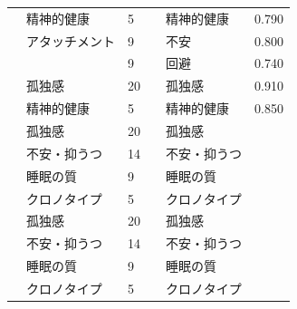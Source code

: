 \begin{landscape}
\begin{longtable}{p{2cm}p{2cm}p{2cm}p{6cm}p{2cm}p{2cm}}
		                         & 精神的健康                            & 5   &                                                     & 精神的健康                & 0.790      \\
		                         & アタッチメント                          & 9   &                                                     & 不安                   & 0.800      \\
		                         &                                  & 9   &                                                     & 回避                   & 0.740      \\
		                         & 孤独感                              & 20  &                                                     & 孤独感                  & 0.910      \\
		                         & 精神的健康                            & 5   &                                                     & 精神的健康                & 0.850      \\
		\textcite{Sugiyama202192}   & 孤独感                              & 20  &                                                     & 孤独感                  &            \\
		                         & 不安・抑うつ                           & 14  &                                                     & 不安・抑うつ               &            \\
		                         & 睡眠の質                             & 9   &                                                     & 睡眠の質                 &            \\
		                         & クロノタイプ                           & 5   &                                                     & クロノタイプ               &            \\
		                         & 孤独感                              & 20  &                                                     & 孤独感                  &            \\
		                         & 不安・抑うつ                           & 14  &                                                     & 不安・抑うつ               &            \\
		                         & 睡眠の質                             & 9   &                                                     & 睡眠の質                 &            \\
		                         & クロノタイプ                           & 5   &                                                     & クロノタイプ               &            \\

\end{longtable}
\end{landscape}
